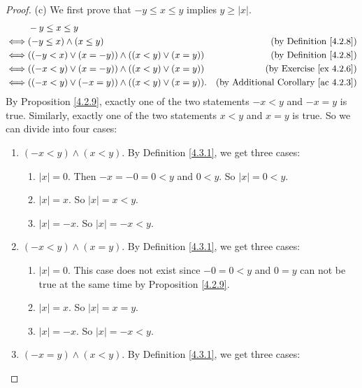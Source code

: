 \begin{proof}{(c)}
We first prove that \(-y \leq x \leq y\) implies \(y \geq |x|\).
\begin{align*}
& -y \leq x \leq y \\
\iff & (-y \leq x) \land (x \leq y) & \text{(by Definition \ref{4.2.8})} \\
\iff & ((-y < x) \lor (x = -y)) \land ((x < y) \lor (x = y)) & \text{(by Definition \ref{4.2.8})} \\
\iff & ((-x < y) \lor (x = -y)) \land ((x < y) \lor (x = y)) & \text{(by Exercise \ref{ex 4.2.6})} \\
\iff & ((-x < y) \lor (-x = y)) \land ((x < y) \lor (x = y)). & \text{(by Additional Corollary \ref{ac 4.2.3})}
\end{align*}
By Proposition \ref{4.2.9}, exactly one of the two statements \(-x < y\) and \(-x = y\) is true.
Similarly, exactly one of the two statements \(x < y\) and \(x = y\) is true.
So we can divide into four cases:
\begin{enumerate}[label=(\Roman*)]
    \item \((-x < y) \land (x < y)\).
    By Definition \ref{4.3.1}, we get three cases:
    \begin{enumerate}[label=(\roman*)]
        \item \(|x| = 0\).
        Then \(-x = -0 = 0 < y\) and \(0 < y\).
        So \(|x| = 0 < y\).
        \item \(|x| = x\).
        So \(|x| = x < y\).
        \item \(|x| = -x\).
        So \(|x| = -x < y\).
    \end{enumerate}
    \item \((-x < y) \land (x = y)\).
    By Definition \ref{4.3.1}, we get three cases:
    \begin{enumerate}[label=(\roman*)]
        \item \(|x| = 0\).
        This case does not exist since \(-0 = 0 < y\) and \(0 = y\) can not be true at the same time by Proposition \ref{4.2.9}.
        \item \(|x| = x\).
        So \(|x| = x = y\).
        \item \(|x| = -x\).
        So \(|x| = -x < y\).
    \end{enumerate}
    \item \((-x = y) \land (x < y)\).
    By Definition \ref{4.3.1}, we get three cases:

\end{enumerate}
\end{proof}
